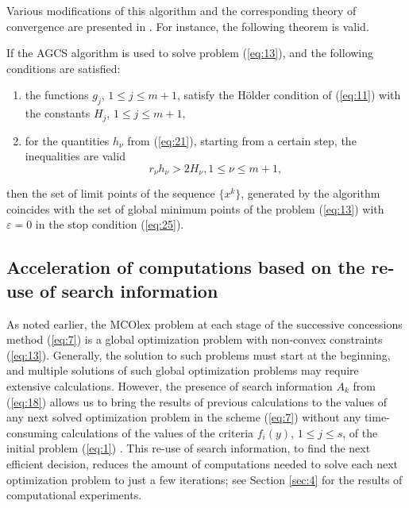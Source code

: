 \documentclass[smallextended]{svjour3}       %
\begin{document}
Various modifications of this algorithm and the corresponding theory of convergence are presented in \cite{c18}. For instance, the following theorem is valid.

\begin{theorem}
If the AGCS algorithm is used to solve problem (\ref{eq:13}), and the following conditions are satisfied:
\begin{enumerate}
	\item the functions $g_j$, $1 \leq j \leq m+1$,  satisfy the H\"older condition of (\ref{eq:11}) with the constants $H_j$, $1 \leq j \leq m+1$,
	\item for the quantities $h_\nu$ from (\ref{eq:21}), starting from a certain step, the inequalities are valid
\begin{equation*}
r_\nu h_\nu>2H_\nu, 1\leq \nu \leq m+1,
\end{equation*}
\end{enumerate}
then the set of limit points of the sequence $\{x^k\}$, generated by the algorithm coincides with the set of global minimum points of the problem (\ref{eq:13}) with $\varepsilon=0$ in the stop condition (\ref{eq:25}).
\end{theorem}

\subsection{Acceleration of computations based on the re-use of search information}

As noted earlier, the MCOlex problem at each stage of the successive concessions method (\ref{eq:7}) is a global optimization problem with non-convex constraints (\ref{eq:13}). Generally, the solution to such problems must start at the beginning, and multiple solutions of such global optimization problems may require extensive calculations. However, the presence of search information $A_k$ from (\ref{eq:18}) allows us to bring the results of previous calculations to the values of any next solved optimization problem in the scheme (\ref{eq:7}) without any time-consuming calculations of the values of the criteria $f_i (y)$, $1 \leq j \leq s$,  of the initial problem (\ref{eq:1}) \cite{c30,c31}. This re-use of search information, to find the next efficient decision, reduces the amount of computations needed to solve each next optimization problem to just a few iterations; see Section \ref{sec:4} for the results of computational experiments.
\end{document}
